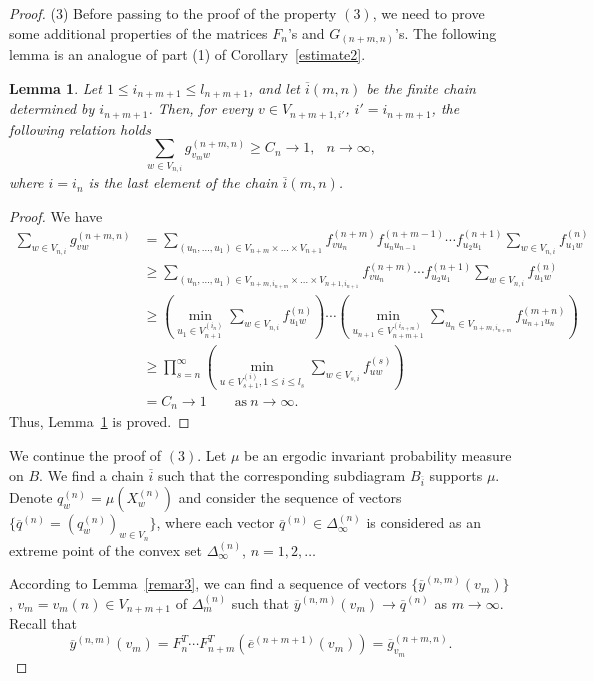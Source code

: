 \documentclass[11pt, english, reqno]{amsart}
\theoremstyle{definition}
\theoremstyle{remark}
\theoremstyle{plain}
\newtheorem{lemma}[defin]{Lemma}
\def\ov{\overline}
\numberwithin{equation}{section}
\begin{document}
{\begin{proof}
\medskip
(3) Before passing to the proof of the property $(3)$, we need to prove
some additional
properties of the matrices $F_n$'s and $G_{(n+m,n)}$'s. The following
lemma is an analogue of part (1) of Corollary~\ref{estimate2}.

\begin{lemma}\label{prop4.3}
Let $1 \leq i_{n+m+1} \leq l_{n+m+1}$, and let $\ov i(m,n)$ be the
finite chain determined by $i_{n+m+1}$. Then, for every $v \in
V_{n+m+1,i'}$, $i' = i_{n+m+1}$, the following relation holds
$$
\sum_{w \in V_{n, i}} g_{v_m w}^{(n+m,n)} \geq C_n \rightarrow 1,\; \ \
n\rightarrow \infty,
$$
where $i = i_n$ is the last element of the chain $\ov i(m,n)$.
\end{lemma}

\begin{proof}
We have
$$
\begin{aligned}
\sum_{w \in V_{n,i}}g_{v w}^{(n+m,n)} & =
\sum_{(u_n,\ldots,u_1) \in
V_{n+m}\times\ldots\times V_{n+1}} f_{vu_n}^{(n+m)}
f_{u_n u_{n-1}}^{(n+m-1)}\cdots f_{u_2 u_1}^{(n+1)}\sum_{w \in
 V_{n,i}}f_{u_1w}^{(n)}\\
& \geq \sum_{(u_n,\ldots,u_1) \in V_{n+m, i_{n+m}}\times\ldots\times
 V_{n+1, i_{n+1}}} f_{vu_n}^{(n+m)}
 \cdots
  f_{u_2 u_1}^{(n+1)}\sum_{w \in V_{n,i}}f_{u_1w}^{(n)} \\
& \geq \left(\min_{u_1 \in V_{n+1}^{(i_n)}}\sum_{w \in V_{n,i}}
f_{u_1w}^{(n)}\right)
\cdots  \left(\min_{u_{n+1} \in V_{n+m+1}^{(i_{n+m})}}\sum_{u_{n} \in V_{n+m, i_{n+m}}}f_{u_{n+1}u_n}^{(m+n)}\right) \\
&\geq \prod_{s = n}^{\infty}\left(\min_{u \in V_{s+1}^{(i)}, 1 \leq i \leq l_s}\sum_{w \in V_{s,i}}f_{uw}^{(s)}\right)\\
& = C_n \rightarrow 1 \qquad \mbox{as} \ n \to \infty.
\end{aligned}
$$
 Thus, Lemma~\ref{prop4.3} is proved.
\end{proof}

We continue the proof of $(3)$. Let $\mu$ be an ergodic invariant probability
measure on $B$. We find a chain $\ov i$ such that the corresponding
subdiagram $B_{\ov i}$ supports $\mu$. Denote $q_w^{(n)} =
\mu(X_w^{(n)})$ and consider the sequence of vectors $\{\ov q^{(n)} =
(q_w^{(n)})_{w \in V_n}\}$, where each vector $\ov q^{(n)} \in
\Delta_{\infty}^{(n)}$ is considered as an extreme point of the convex set $
\Delta_{\infty}^{(n)}$, $n = 1,2,\ldots$

According to Lemma~\ref{remar3}, we can find a sequence of vectors $\{\ov
y^{(n,m)}(v_m)\}$, $v_m = v_m(n) \in V_{n+m+1}$ of $\Delta_m^{(n)}$
such that $\ov y^{(n,m)}(v_m) \rightarrow \ov q^{(n)}$ as $m \rightarrow
\infty$. Recall that
$$
\ov y^{(n,m)}(v_m) = F_n^T \cdots F_{n+m}^T (\ov e^{(n+m+1)}(v_m)) =
\ov g_{v_m}^{(n+m,n)}.
$$


\end{proof}}
\end{document}

